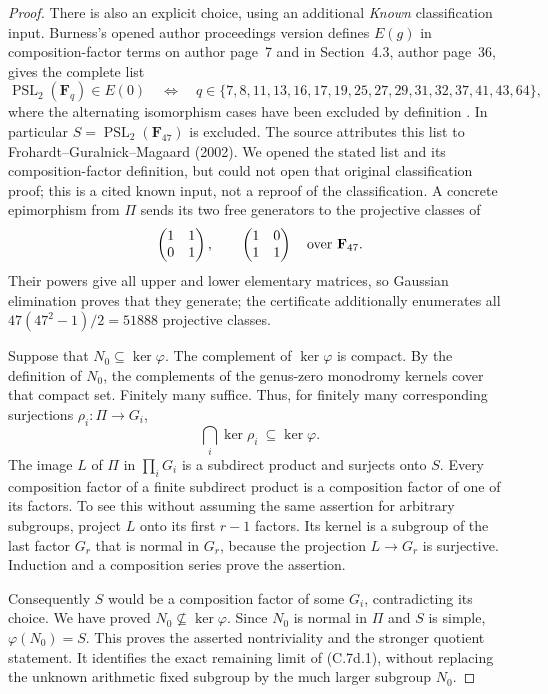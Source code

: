 \begin{proof}
There is also an explicit choice, using an additional \emph{Known}
classification input. Burness's opened author proceedings version
defines $E(g)$ in composition-factor terms on author page~7 and
in Section~4.3, author page~36, gives the complete list
\[
 \operatorname{PSL}_2(\mathbf F_q)\in E(0)
 \quad\Longleftrightarrow\quad
 q\in\{7,8,11,13,16,17,19,25,27,29,31,32,37,41,43,64\},
\]
where the alternating isomorphism cases have been excluded by definition
\cite[author pp.~7,36, Section~4.3]{BC_Burness2018}.
In particular $S=\operatorname{PSL}_2(\mathbf F_{47})$ is excluded.
The source attributes this list to Frohardt--Guralnick--Magaard (2002).
We opened the stated list and its composition-factor definition, but
could not open that original classification proof; this is a cited
known input, not a reproof of the classification. A concrete epimorphism
from $\Pi$ sends its two free generators to the projective classes of
\[
       \begin{pmatrix}1&1\\0&1\end{pmatrix},\qquad
       \begin{pmatrix}1&0\\1&1\end{pmatrix}
                           \quad\hbox{over }\mathbf F_{47}.
\]
Their powers give all upper and lower elementary matrices, so Gaussian
elimination proves that they generate; the certificate additionally
enumerates all $47(47^2-1)/2=51888$ projective classes.

Suppose that $N_0\subseteq\ker\varphi$. The complement of
$\ker\varphi$ is compact. By the definition of $N_0$, the complements
of the genus-zero monodromy kernels cover that compact set.
Finitely many suffice. Thus, for finitely many corresponding
surjections $\rho_i:\Pi\to G_i$,
\[
                  \bigcap_i\ker\rho_i\ \subseteq\ker\varphi.
\]
The image $L$ of $\Pi$ in $\prod_iG_i$ is a subdirect product and
surjects onto $S$. Every composition factor of a finite subdirect
product is a composition factor of one of its factors. To see this
without assuming the same assertion for arbitrary subgroups, project
$L$ onto its first $r-1$ factors. Its kernel is a subgroup of the last
factor $G_r$ that is normal in $G_r$, because the projection
$L\to G_r$ is surjective. Induction and a composition series prove
the assertion.

Consequently $S$ would be a composition factor of some $G_i$,
contradicting its choice. We have proved
$N_0\not\subseteq\ker\varphi$. Since $N_0$ is normal in $\Pi$
and $S$ is simple, $\varphi(N_0)=S$. This proves the asserted
nontriviality and the stronger quotient statement. It identifies
the exact remaining limit of (C.7d.1), without replacing the
unknown arithmetic fixed subgroup by the much larger subgroup $N_0$.
\end{proof}

